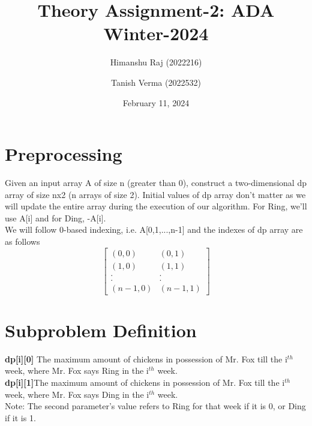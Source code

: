 \documentclass{article}
\title{Theory Assignment-2: ADA Winter-2024}
\author{Himanshu Raj (2022216) \and Tanish Verma (2022532)}
\date{February 11, 2024}
\begin{document}
\maketitle

\section{Preprocessing}
Given an input array A of size n (greater than 0), construct a two-dimensional dp array of size nx2 (n arrays of size 2). Initial values of dp array don't matter as we will update the entire array during the execution of our algorithm. For Ring, we'll use A[i] and for Ding, -A[i].
\\We will follow 0-based indexing, i.e. A[0,1,...,n-1] and
the indexes of dp array are as follows
\[
  \begin{bmatrix}
    (0,0) & (0,1) \\
    (1,0) & (1,1) \\
    . & . \\
    . & . \\
    (n-1,0) & (n-1,1)
  \end{bmatrix}
\]

\section{Subproblem Definition}
\textbf{dp[i][0]} \textrightarrow The maximum amount of chickens in possession of Mr. Fox till the i$^{th}$ week, where Mr. Fox says Ring in the i$^{th}$ week.\\
\textbf{dp[i][1]}\textrightarrow The maximum amount of chickens in possession of Mr. Fox till the i$^{th}$ week, where Mr. Fox says Ding in the i$^{th}$ week.\\
Note: The second parameter's value refers to Ring for that week if it is 0, or Ding if it is 1.
\end{document}
